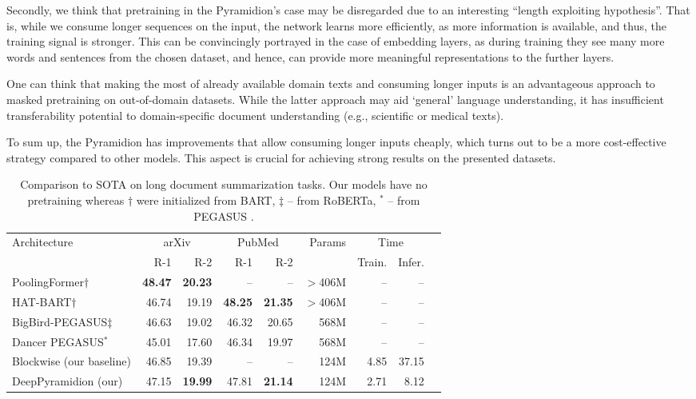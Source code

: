 \documentclass{article}
\begin{document}
Secondly, we think that pretraining in the Pyramidion’s case may be disregarded due to an interesting “length exploiting hypothesis”. That is, while we consume longer sequences on the input, the network learns more efficiently, as more information is available, and thus, the training signal is stronger. This can be convincingly portrayed in the case of embedding layers, as during training they see many more words and sentences from the chosen dataset, and hence, can provide more meaningful representations to the further layers.

One can think that making the most of already available domain texts and consuming longer inputs is an advantageous approach to masked pretraining on out-of-domain datasets. While the latter approach may aid ‘general’ language understanding, it has insufficient transferability potential to domain-specific document understanding (e.g.,  scientific or medical texts).

To sum up, the Pyramidion has improvements that allow consuming longer inputs cheaply, which turns out to be a more cost-effective strategy compared to other models. This aspect is crucial for achieving strong results on the presented datasets.

\begin{table*}[t]
    \caption{Comparison to SOTA on long document summarization tasks.
    Our models have no pretraining whereas $\dagger$ were initialized from BART, $\ddag$ -- from RoBERTa, $^*$ -- from PEGASUS  \citep{zhang2021poolingformer,rohde2021hierarchical,zaheer2020bigbird,gidiotis2020divideandconquer}.}
    \label{tab:sota}
    \centering
\begin{tabular}{lrrrrrrrr}
    \toprule
    \multirow{2}{*}{Architecture} &
    \multicolumn{2}{c}{arXiv} &
    \multicolumn{2}{c}{PubMed} &
    \multirow{2}{*}{Params} &
\multicolumn{2}{c}{Time}
\\
    & R-1 & R-2 & R-1 & R-2 & & Train. & Infer. \\
    \midrule
    PoolingFormer$\dagger$ & \textbf{48.47}& \textbf{20.23} & -- & -- & $>$406M  & -- & -- \\
    HAT-BART$\dagger$ & 46.74 & 19.19 & \textbf{48.25} & \textbf{21.35 }& $>$406M & -- & -- \\
    BigBird-PEGASUS$\ddag$ & 46.63 & 19.02 & 46.32 & 20.65 &  568M & -- & -- \\
    Dancer PEGASUS$^*$ & 45.01 & 17.60 & 46.34 & 19.97 & 568M & -- & -- \\
    \midrule
    Blockwise (our baseline) & 46.85 & 19.39 & -- & -- & 124M  & 4.85 & 37.15\\
    DeepPyramidion (our) & 47.15 & \textbf{19.99} & 47.81 & \textbf{21.14} & 124M & 2.71 & 8.12 \\
    \bottomrule
    \end{tabular}
\end{table*}
\end{document}
